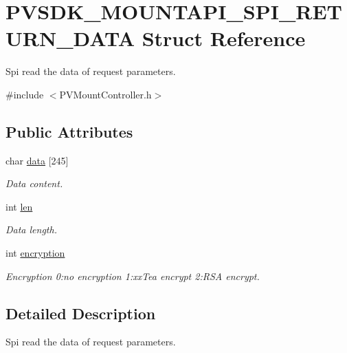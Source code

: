 \hypertarget{struct_p_v_s_d_k___m_o_u_n_t_a_p_i___s_p_i___r_e_t_u_r_n___d_a_t_a}{}\section{P\+V\+S\+D\+K\+\_\+\+M\+O\+U\+N\+T\+A\+P\+I\+\_\+\+S\+P\+I\+\_\+\+R\+E\+T\+U\+R\+N\+\_\+\+D\+A\+TA Struct Reference}
\label{struct_p_v_s_d_k___m_o_u_n_t_a_p_i___s_p_i___r_e_t_u_r_n___d_a_t_a}


Spi read the data of request parameters.  




{\ttfamily \#include $<$P\+V\+Mount\+Controller.\+h$>$}

\subsection*{Public Attributes}
\begin{DoxyCompactItemize}
\item 
char \hyperlink{struct_p_v_s_d_k___m_o_u_n_t_a_p_i___s_p_i___r_e_t_u_r_n___d_a_t_a_ab10da45b28cd24e4c5362469bb0eea6c}{data} \mbox{[}245\mbox{]}
\begin{DoxyCompactList}\small\item\em Data content. \end{DoxyCompactList}\item 
int \hyperlink{struct_p_v_s_d_k___m_o_u_n_t_a_p_i___s_p_i___r_e_t_u_r_n___d_a_t_a_aba2c412986cf5b296645e9deea93ce16}{len}
\begin{DoxyCompactList}\small\item\em Data length. \end{DoxyCompactList}\item 
int \hyperlink{struct_p_v_s_d_k___m_o_u_n_t_a_p_i___s_p_i___r_e_t_u_r_n___d_a_t_a_abdea50e93fbcd3a53e1a1836e16f24b8}{encryption}
\begin{DoxyCompactList}\small\item\em Encryption 0\+:no encryption 1\+:xx\+Tea encrypt 2\+:R\+SA encrypt. \end{DoxyCompactList}\end{DoxyCompactItemize}


\subsection{Detailed Description}
Spi read the data of request parameters. 

